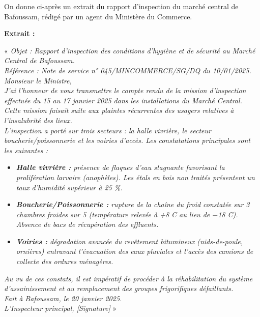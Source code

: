 \documentclass[11pt]{article}
\newcounter{popsec}
\newcounter{popsub}
\newcommand{\courssub}[1]{%
  \stepcounter{popsub}%
  \par\vspace{9pt}\noindent{\popxbold\fontsize{11.5}{13}\selectfont\color{popink}{\color{poporange}\thepopsec.\thepopsub}\hspace{6pt}#1}\par\nopagebreak\vspace{4pt}
}
\begin{document}
\courssub{Je m'entraîne}

\begin{exercice}
On donne ci-après un extrait du rapport d'inspection du marché central de Bafoussam, rédigé par un agent du Ministère du Commerce.

\textbf{Extrait :}

« \emph{Objet : Rapport d'inspection des conditions d'hygiène et de sécurité au Marché Central de Bafoussam.\\
Référence : Note de service n° 045/MINCOMMERCE/SG/DQ du 10/01/2025.\\
Monsieur le Ministre,\\
J'ai l'honneur de vous transmettre le compte rendu de la mission d'inspection effectuée du 15 au 17 janvier 2025 dans les installations du Marché Central. Cette mission faisait suite aux plaintes récurrentes des usagers relatives à l'insalubrité des lieux.\\
L'inspection a porté sur trois secteurs : la halle vivrière, le secteur boucherie/poissonnerie et les voiries d'accès. Les constatations principales sont les suivantes :}
\begin{itemize}
\item \emph{\textbf{Halle vivrière :} présence de flaques d'eau stagnante favorisant la prolifération larvaire (anophèles). Les étals en bois non traités présentent un taux d'humidité supérieur à 25 \%.}
\item \emph{\textbf{Boucherie/Poissonnerie :} rupture de la chaîne du froid constatée sur 3 chambres froides sur 5 (température relevée à +8 \textdegree C au lieu de $-$18 \textdegree C). Absence de bacs de récupération des effluents.}
\item \emph{\textbf{Voiries :} dégradation avancée du revêtement bitumineux (nids-de-poule, ornières) entravant l'évacuation des eaux pluviales et l'accès des camions de collecte des ordures ménagères.}
\end{itemize}
\emph{Au vu de ces constats, il est impératif de procéder à la réhabilitation du système d'assainissement et au remplacement des groupes frigorifiques défaillants.\\
Fait à Bafoussam, le 20 janvier 2025.\\
L'Inspecteur principal, [Signature]} »


\end{exercice}
\end{document}
